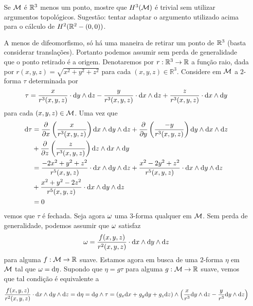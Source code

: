 \begin{Mybox}
Se $\mathcal{M}$ é $\mathbb{R}^3$ menos um ponto, mostre que $H^3(\mathcal{M})$ é trivial sem utilizar argumentos topológicos. Sugestão: tentar adaptar o argumento utilizado acima para o cálculo de $H^2(\mathbb{R}^2 - (0,0))$.
\vspace{-.4cm}
\end{Mybox}
\vspace{-.4cm}
\begin{dem}
A menos de difeomorfismo, só há uma maneira de retirar um ponto de $\mathbb{R}^3$ (basta considerar translações). Portanto podemos assumir sem perda de generalidade que o ponto retirado é a origem. Denotaremos por $r: \mathbb{R}^3 \to \mathbb{R}$ a função raio, dada por $r(x, y, z) = \sqrt{x^2 + y^2 + z^2}$ para cada $(x, y, z) \in \mathbb{R}^3$. Considere em $\mathcal{M}$ a $2$-forma $\tau$ determinada por
\[
\tau = \frac{x}{r^3(x, y, z)} \cdot \mathrm{d} y \wedge \mathrm{d} z - \frac{y}{r^3(x, y, z)} \cdot \mathrm{d} x \wedge \mathrm{d} z + \frac{z}{r^3(x, y, z)} \cdot \mathrm{d} x \wedge \mathrm{d} y
\]
para cada $(x, y, z) \in \mathcal{M}$. Uma vez que
\begin{align*}
\mathrm{d} \tau &= \frac{\partial}{\partial x} \left(\frac{x}{r^3(x, y, z)} \right)  \mathrm{d} x \wedge \mathrm{d} y \wedge \mathrm{d} z  + \frac{\partial}{\partial y}  \left(\frac{-y}{r^3(x, y, z)} \right) \mathrm{d} y \wedge \mathrm{d} x \wedge \mathrm{d} z  \\
&+\frac{\partial}{\partial z} \left(\frac{z}{r^3(x, y, z)} \right)   \mathrm{d} z \wedge \mathrm{d} x \wedge \mathrm{d} y \\
&= \frac{-2x^2 + y^2 + z^2}{r^5(x, y, z)} \cdot \mathrm{d} x \wedge \mathrm{d} y \wedge \mathrm{d} z + \frac{x^2 -2 y^2 + z^2}{r^5(x, y, z)} \cdot \mathrm{d} x \wedge \mathrm{d} y \wedge \mathrm{d} z \\
&+\frac{x^2 + y^2 - 2 z^2}{r^5(x, y, z)} \cdot \mathrm{d} x \wedge \mathrm{d} y \wedge \mathrm{d} z  \\
&= 0
\end{align*}
vemos que $\tau$ é fechada. Seja agora $\omega$ uma $3$-forma qualquer em $\mathcal{M}$. Sem perda de generalidade, podemos assumir que $\omega$ satisfaz
\[
\omega =  \frac{f(x, y, z)}{r^2(x, y, z)} \cdot \mathrm{d} x \wedge \mathrm{d} y \wedge \mathrm{d} z
\]
para alguma $f: \mathcal{M} \to \mathbb{R}$ suave. Estamos agora em busca de uma $2$-forma $\eta$ em $\mathcal{M}$ tal que $\omega = \mathrm{d} \eta$. Supondo que $\eta = g \tau$ para alguma $g: \mathcal{M} \to \mathbb{R}$ suave, vemos que tal condição é equivalente a
\begin{equation}\label{cond}
\begin{aligned}
 \frac{f(x, y, z)}{r^2(x, y, z)} \cdot \dd x \wg \dd y \wg \dd z = \dd \eta = \dd g \wg \tau &= (g_x \dd x + g_y \dd y + g_z \dd z) \wg \left(\frac{x}{r^3} \dd y \wg \dd z - \frac{y}{r^3} \dd y \wg \dd z \right) \\

\end{aligned}
\end{equation}
\end{dem}
